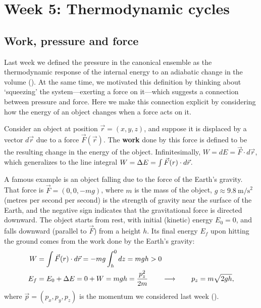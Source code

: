 \renewcommand{\thisweek}{MATH327 Week 5}
\renewcommand{\moddate}{Last modified 1 Mar.~2021}
\setcounter{section}{5}
\setcounter{subsection}{0}
{}
\section*{Week 5: Thermodynamic cycles}
\subsection{Work, pressure and force}
Last week we defined the pressure in the canonical ensemble as the thermodynamic response of the internal energy to an adiabatic change in the volume ().
At the same time, we motivated this definition by thinking about `squeezing' the system---exerting a force on it---which suggests a connection between pressure and force.
Here we make this connection explicit by considering how the energy of an object changes when a force acts on it.

\begin{shaded}
  Consider an object at position $\vec r = (x, y, z)$, and suppose it is displaced by a vector $d\vec r$ due to a force $\vec F(\vec r)$.
  The \textbf{work} done by this force is defined to be the resulting change in the energy of the object.
  Infinitesimally, $W = dE = \vec F\cdot d\vec r$, which generalizes to the line integral $W = \Delta E = \int \vec F(r)\cdot d\vec r$.
\end{shaded}

A famous example is an object falling due to the force of the Earth's gravity.
That force is $\vec F = (0, 0, -mg)$, where $m$ is the mass of the object, $g \approx 9.8~\mathrm{m}/\mathrm{s}^2$ (metres per second per second) is the strength of gravity near the surface of the Earth, and the negative sign indicates that the gravitational force is directed downward.
The object starts from rest, with initial (kinetic) energy $E_0 = 0$, and falls downward (parallel to $\vec F$) from a height $h$.
Its final energy $E_f$ upon hitting the ground comes from the work done by the Earth's gravity:
\begin{align*}
  W & = \int \vec F(r)\cdot d\vec r = -mg \int_h^0 dz = mgh > 0 \\
  E_f & = E_0 + \Delta E = 0 + W = mgh = \frac{p_z^2}{2m} \qquad \longrightarrow \qquad p_z = m\sqrt{2gh},
\end{align*}
where $\vec p = (p_x, p_y, p_z)$ is the momentum we considered last week ().

